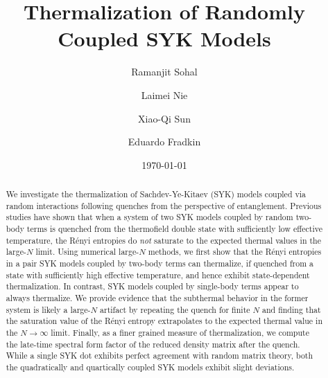 \documentclass[reprint, floatfix,eqsecnum,superscriptaddress,preprint,nofootinbib,onecolumn,amsmath,amssymb,aps,prb]{revtex4-2}
\begin{document}
\begin{titlepage}

\title{Thermalization of Randomly Coupled SYK Models}


\author{Ramanjit Sohal}
\author{Laimei Nie}
\author{Xiao-Qi Sun}
\author{Eduardo Fradkin}

\date{\today}

\begin{abstract}
We investigate the thermalization of Sachdev-Ye-Kitaev (SYK) models coupled via random interactions following quenches from the perspective of entanglement.
Previous studies have shown that when a system of two SYK models coupled by random two-body terms
is quenched from the thermofield double state with sufficiently low effective temperature, the R\'enyi entropies do \emph{not} saturate to the expected thermal values in the large-$N$ limit. Using numerical large-$N$ methods, we first show that the R\'enyi entropies in a pair SYK models coupled by two-body terms can thermalize, if quenched from a state with sufficiently high effective temperature, and hence exhibit state-dependent thermalization. In contrast, SYK models coupled by single-body terms appear to always thermalize.
We provide evidence that the subthermal behavior in the former system is likely a large-$N$ artifact by repeating the quench for finite $N$ and finding that the saturation value of the R\'enyi entropy extrapolates to the expected thermal value in the $N \to \infty$ limit. Finally, as a finer grained measure of thermalization, we compute the late-time spectral form factor of the reduced density matrix after the quench. While a single SYK dot exhibits perfect agreement with random matrix theory, both the quadratically and quartically coupled SYK models exhibit slight deviations. 
\end{abstract}

\maketitle

\end{titlepage}
\end{document}
